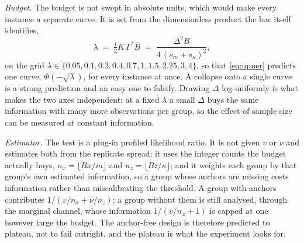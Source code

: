 \emph{Budget.} The budget is not swept in absolute units, which would make every instance
a separate curve. It is set from the dimensionless product the law itself identifies,
\begin{equation}
\lambda \;=\; \tfrac12 K\,\Gamma^{*}B \;=\; \frac{\Delta^{2}B}{4\,(s_{m}+s_{\kappa})^{2}},
\label{eq:lambda}
\end{equation}
on the grid $\lambda\in\{0.05,0.1,0.2,0.4,0.7,1,1.5,2.25,3,4\}$, so that
\eqref{eq:upper} predicts one curve, $\Phi(-\sqrt{\lambda})$, for every instance at once.
A collapse onto a single curve is a strong prediction and an easy one to falsify. Drawing
$\Delta$ log-uniformly is what makes the two axes independent: at a fixed $\lambda$ a small
$\Delta$ buys the same information with many more observations per group, so the effect of
sample size can be measured at constant information.

\emph{Estimator.} The test is a plug-in profiled likelihood ratio. It is not given $v$ or
$\nu$ and estimates both from the replicate spread; it uses the integer counts the budget
actually buys, $n_{x}=\lfloor Bx/m\rfloor$ and $n_{z}=\lfloor Bz/\kappa\rfloor$; and it
weights each group by that group's own estimated information, so a group whose anchors are
missing costs information rather than miscalibrating the threshold. A group with anchors
contributes $1/(v/n_{x}+\nu/n_{z})$; a group without them is still analysed, through the
marginal channel, whose information $1/(v/n_{x}+1)$ is capped at one however large the
budget. The anchor-free design is therefore predicted to plateau, not to fail outright, and
the plateau is what the experiment looks for.

